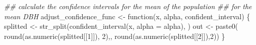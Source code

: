 \documentclass[
  letterpaper,
]{book}
\newenvironment{Shaded}{\begin{snugshade}}{\end{snugshade}}
\newcommand{\AttributeTok}[1]{\textcolor[rgb]{0.40,0.45,0.13}{#1}}
\newcommand{\ControlFlowTok}[1]{\textcolor[rgb]{0.00,0.23,0.31}{#1}}
\newcommand{\DecValTok}[1]{\textcolor[rgb]{0.68,0.00,0.00}{#1}}
\newcommand{\DocumentationTok}[1]{\textcolor[rgb]{0.37,0.37,0.37}{\textit{#1}}}
\newcommand{\FunctionTok}[1]{\textcolor[rgb]{0.28,0.35,0.67}{#1}}
\newcommand{\NormalTok}[1]{\textcolor[rgb]{0.00,0.23,0.31}{#1}}
\newcommand{\OtherTok}[1]{\textcolor[rgb]{0.00,0.23,0.31}{#1}}
\newcommand{\StringTok}[1]{\textcolor[rgb]{0.13,0.47,0.30}{#1}}
\begin{document}
\begin{Shaded}
\begin{Highlighting}[]
\DocumentationTok{\#\# calculate the confidence intervals for the mean of the population}
\DocumentationTok{\#\# for the mean DBH}
\NormalTok{adjust\_confidence\_func }\OtherTok{\textless{}{-}} \ControlFlowTok{function}\NormalTok{(x, alpha, confident\_interval) \{}
\NormalTok{  splitted }\OtherTok{\textless{}{-}} \FunctionTok{str\_split}\NormalTok{(}\FunctionTok{confident\_interval}\NormalTok{(x, }\AttributeTok{alpha =}\NormalTok{ alpha), }\StringTok{\textquotesingle{} \textquotesingle{}}\NormalTok{)}
\NormalTok{  out }\OtherTok{\textless{}{-}} \FunctionTok{paste0}\NormalTok{( }\FunctionTok{round}\NormalTok{(}\FunctionTok{as.numeric}\NormalTok{(splitted[[}\DecValTok{1}\NormalTok{]]), }\DecValTok{2}\NormalTok{),}\StringTok{\textquotesingle{}{-}\textquotesingle{}}\NormalTok{, }\FunctionTok{round}\NormalTok{(}\FunctionTok{as.numeric}\NormalTok{(splitted[[}\DecValTok{2}\NormalTok{]]),}\DecValTok{2}\NormalTok{))}
\NormalTok{\}}


\end{Highlighting}
\end{Shaded}
\end{document}
